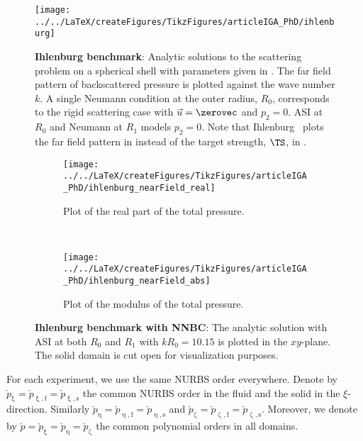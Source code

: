 \begin{figure}
	\centering
	\texttt{[image: ../../LaTeX/createFigures/TikzFigures/articleIGA\_PhD/ihlenburg]}
	\caption{\textbf{Ihlenburg benchmark}: Analytic solutions to the scattering problem on a spherical shell with parameters given in . The far field pattern of backscattered pressure is plotted against the wave number $k$. A single Neumann condition at the outer radius, $R_0$, corresponds to the rigid scattering case with $\vec{u}=\zerovec$ and $p_2=0$. ASI at $R_0$ and Neumann at $R_1$ models $p_2=0$. Note that Ihlenburg~\cite[p. 192]{Ihlenburg1998fea} plots the far field pattern in  instead of the target strength, $\TS$, in .}
	\label{Fig2:ihlenburgTSexact}
\end{figure}
\begin{figure}
	\centering
	\begin{subfigure}[t]{0.48\textwidth}
		\centering
		\texttt{[image: ../../LaTeX/createFigures/TikzFigures/articleIGA\_PhD/ihlenburg\_nearField\_real]}
		\caption{Plot of the real part of the total pressure.}
	\end{subfigure}
	~
	\begin{subfigure}[t]{0.48\textwidth}
		\centering
		\texttt{[image: ../../LaTeX/createFigures/TikzFigures/articleIGA\_PhD/ihlenburg\_nearField\_abs]}
		\caption{Plot of the modulus of the total pressure.}
	\end{subfigure}
	
	\caption{\textbf{Ihlenburg benchmark with NNBC}: The analytic solution with ASI at both $R_0$ and $R_1$ with $kR_0=10.15$ is plotted in the $xy$-plane. The solid domain is cut open for visualization purposes.}
	\label{Fig2:ihlenburg3Dexact}
\end{figure}
For each experiment, we use the same NURBS order everywhere. Denote by $\check{p}_\upxi = \check{p}_{\upxi,\mathrm{f}} = \check{p}_{\upxi,\mathrm{s}}$ the common NURBS order in the fluid and the solid in the $\xi$-direction. Similarly $\check{p}_\upeta = \check{p}_{\upeta,\mathrm{f}} = \check{p}_{\upeta,\mathrm{s}}$ and $\check{p}_\upzeta = \check{p}_{\upzeta,\mathrm{f}} = \check{p}_{\upzeta,\mathrm{s}}$. Moreover, we denote by $\check{p} = \check{p}_\upxi = \check{p}_\upeta = \check{p}_\upzeta$ the common polynomial orders in all domains.

